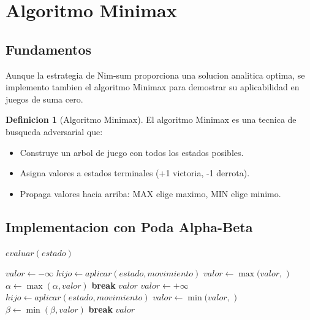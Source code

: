 \documentclass[12pt,a4paper]{article}
\theoremstyle{definition}
\newtheorem{definicion}{Definicion}[section]
\begin{document}
\section{Algoritmo Minimax}

\subsection{Fundamentos}

Aunque la estrategia de Nim-sum proporciona una solucion analitica optima, se implemento tambien el algoritmo Minimax para demostrar su aplicabilidad en juegos de suma cero.

\begin{definicion}[Algoritmo Minimax]
El algoritmo Minimax es una tecnica de busqueda adversarial que:
\begin{itemize}
    \item Construye un arbol de juego con todos los estados posibles.
    \item Asigna valores a estados terminales (+1 victoria, -1 derrota).
    \item Propaga valores hacia arriba: MAX elige maximo, MIN elige minimo.
\end{itemize}
\end{definicion}

\subsection{Implementacion con Poda Alpha-Beta}

\begin{algorithm}[H]
\caption{Minimax con Poda Alpha-Beta}
\begin{algorithmic}[1]
        \State \Return $evaluar(estado)$
    \EndIf
    
        \State $valor \gets -\infty$
            \State $hijo \gets aplicar(estado, movimiento)$
            \State $valor \gets \max(valor,$ $)$
            \State $\alpha \gets \max(\alpha, valor)$
            \If{$\beta \leq \alpha$}
                \State \textbf{break}
            \EndIf
        \EndFor
        \State \Return $valor$
    \Else
        \State $valor \gets +\infty$
            \State $hijo \gets aplicar(estado, movimiento)$
            \State $valor \gets \min(valor,$ $)$
            \State $\beta \gets \min(\beta, valor)$
            \If{$\beta \leq \alpha$}
                \State \textbf{break}
            \EndIf
        \EndFor
        \State \Return $valor$
    \EndIf
\EndFunction
\end{algorithmic}
\end{algorithm}
\end{document}
